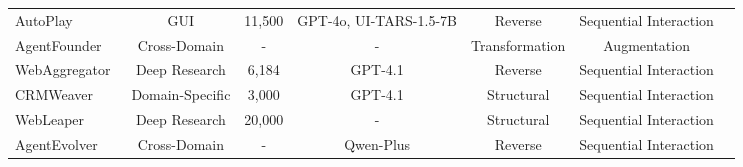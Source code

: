 \documentclass{llmxive}
\providecommand{\Filtering}{
  \begin{tikzpicture}[baseline=(char.base)]
    \fill[textgreen!50] (0,0) circle (0.18);
    \node[white, font=\scriptsize\rmfamily, inner sep=0pt] (char) at (0,0) {F};
  \end{tikzpicture}
}
\providecommand{\Correction}{
  \begin{tikzpicture}[baseline=(char.base)]
    \fill[frameblue!50] (0,0) circle (0.18);
    \node[white, font=\scriptsize\rmfamily, inner sep=0pt] (char) at (0,0) {C};
  \end{tikzpicture}
}
\begin{document}
\begin{table}[!htbp]
{\begin{tabular}{lcccccc}
AutoPlay~\cite{AutoPlay}                              & GUI             & 11,500                & GPT-4o, UI-TARS-1.5-7B                     & Reverse                                 & Sequential Interaction                              & \Filtering                                   \\
AgentFounder~\cite{AgentFounder}                          & Cross-Domain    & -                    & -                                          & Transformation                                     & Augmentation                                                 & \Filtering\hspace{-0.4em}\Correction                          \\
WebAggregator~\cite{WebAggregator} & Deep Research   & 6,184                & GPT-4.1                                    & Reverse                                     & Sequential Interaction                              & \Filtering                                      \\
CRMWeaver~\cite{CRMWeaver}                             & Domain-Specific & 3,000                   & GPT-4.1                                    & Structural                          & Sequential Interaction                              & \Filtering                                      \\
WebLeaper~\cite{WebLeaper}                             & Deep Research   & 20,000                  & -                                          & Structural                          & Sequential Interaction                              & \Filtering                                      \\
AgentEvolver~\cite{AgentEvolver}                          & Cross-Domain    & -                    & Qwen-Plus                                  & Reverse                                  & Sequential Interaction                              & \Filtering                                      \\

\end{tabular}}
\end{table}
\end{document}
